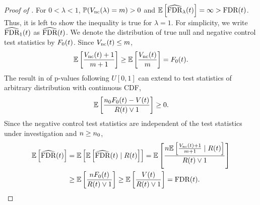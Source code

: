 \begin{proof}[Proof of ]

For $0 < \lambda < 1$, $\mathbb{P}(V_{\text{nc}}(\lambda) = m) > 0$ and $\mathbb{E}\left[\widehat{\text{FDR}}_\lambda (t)\right] = \infty > \text{FDR}(t)$.
Thus, it is left to show the inequality is true for $\lambda = 1$. For simplicity, we write $\widehat{\text{FDR}}_1 (t)$ as $\widehat{\text{FDR}} (t)$.
We denote the distribution of true null and negative control test statistics by ${F_{0}}(t)$.
Since $V_{\text{nc}}(t) \le m$,
\begin{align}\label{proof:eq:cdf.estimate}
    \mathbb{E}\left[\frac{V_{\text{nc}}(t)+1}{m+1}\right]  \ge \mathbb{E}\left[\frac{V_{\text{nc}}(t)}{m}\right] = {F_{0}}(t).
\end{align}
The result in \cite[Theorem 1]{storey2004strong} of p-values following $U[0,1]$ can extend to test statistics of arbitrary distribution with continuous CDF,
\begin{align}\label{proof:eq:FDR.estimate}
     \mathbb{E}\left[\frac{{n_0} {F_{0}}(t) - V(t)}{R(t) \vee 1} \right] \ge 0.
\end{align}
Since the negative control test statistics are independent of the test statistics under investigation and ${n} \ge {n_0}$,
\begin{align*}
    \mathbb{E}\left[\widehat{\text{FDR}}(t)\right]
    &=\mathbb{E}\left[\mathbb{E}\left[\widehat{\text{FDR}}(t) \mid R(t)\right] \right]
    =\mathbb{E}\left[\frac{{n} \mathbb{E}\left[\frac{V_{\text{nc}}(t)+1}{m+1} \mid  R(t)\right]}{R(t) \vee 1}  \right] \\
    &\ge \mathbb{E}\left[\frac{{n} {F_{0}}(t)}{R(t) \vee 1} \right]
    \ge \mathbb{E}\left[\frac{V(t)}{R(t) \vee 1} \right] = \text{FDR}(t).
\end{align*}
\end{proof}



